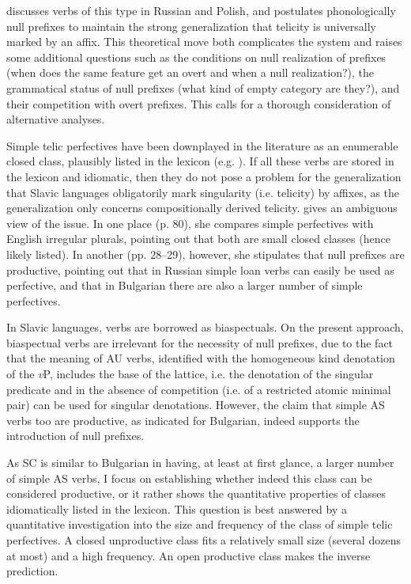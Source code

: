 \documentclass[output=paper]{langscibook}
\begin{document}
\noindent \citet{Lazor.2010} discusses verbs of this type in Russian and Polish, and postulates phonologically null prefixes to maintain the strong generalization that telicity is universally marked by an affix. This theoretical move both complicates the system and raises some additional questions such as the conditions on null realization of prefixes (when does the same feature get an overt and when a null realization?), the grammatical status of null prefixes (what kind of empty category are they?), and their competition with overt prefixes. This calls for a thorough consideration of alternative analyses. 

Simple telic perfectives have been downplayed in the literature as an enumerable closed class, plausibly listed in the lexicon (e.g. \cite{Topor.2000}). If all these verbs are stored in the lexicon and idiomatic, then they do not pose a problem for the generalization that Slavic languages obligatorily mark singularity (i.e. telicity) by affixes, as the generalization only concerns compositionally derived telicity. \citet{Lazor.2010} gives an ambiguous view of the issue. In one place (p. 80), she compares simple perfectives with English irregular plurals, pointing out that both are small closed classes (hence likely listed). In another (pp. 28--29), however, she stipulates that null prefixes are productive, pointing out that in Russian simple loan verbs can easily be used as perfective, and that in Bulgarian there are also a larger number of simple perfectives. 

In Slavic languages, verbs are borrowed as biaspectuals. On the present approach, biaspectual verbs are irrelevant for the necessity of null prefixes, due to the fact that the meaning of AU verbs, identified with the homogeneous kind denotation of the \textit{v}P, includes the base of the lattice, i.e. the denotation of the singular predicate and in the absence of competition (i.e. of a restricted atomic minimal pair) can be used for singular denotations. However, the claim that simple AS verbs too are productive, as indicated for Bulgarian, indeed supports the introduction of null prefixes. 

As SC is similar to Bulgarian in having, at least at first glance, a larger number of simple AS verbs, I focus on establishing whether indeed this class can be considered productive, or it rather shows the quantitative properties of classes idiomatically listed in the lexicon. This question is best answered by a quantitative investigation into the size and frequency of the class of simple telic perfectives. A closed unproductive class fits a relatively small size (several dozens at most) and a high frequency. An open productive class makes the inverse prediction. 
\end{document}
